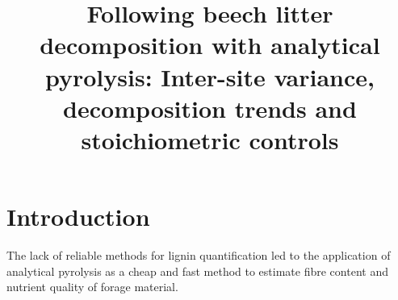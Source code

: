 \documentclass[preprint,12pt]{elsarticle}
\begin{document}
\begin{frontmatter}



\title{Following beech litter decomposition with analytical pyrolysis: Inter-site variance, decomposition trends and stoichiometric controls}


\author{}

\address{}

\begin{abstract}

\end{abstract}

\begin{keyword}


\end{keyword}

\end{frontmatter}



\section{Introduction}
The lack of reliable methods for lignin quantification led to the application of analytical pyrolysis as a cheap and fast method to estimate fibre content and nutrient quality of forage material. 
\end{document}
